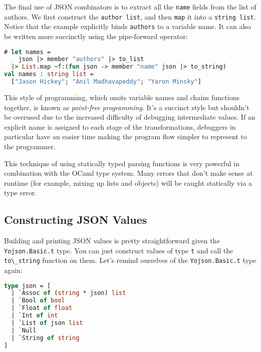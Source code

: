 The final use of JSON combinators is to extract all the
\passthrough{\lstinline!name!} fields from the list of authors. We first
construct the \passthrough{\lstinline!author list!}, and then
\passthrough{\lstinline!map!} it into a
\passthrough{\lstinline!string list!}. Notice that the example
explicitly binds \passthrough{\lstinline!authors!} to a variable name.
It can also be written more succinctly using the pipe-forward operator:

\begin{lstlisting}[language=Caml]
# let names =
    json |> member "authors" |> to_list
  |> List.map ~f:(fun json -> member "name" json |> to_string)
val names : string list =
  ["Jason Hickey"; "Anil Madhavapeddy"; "Yaron Minsky"]
\end{lstlisting}

This style of programming, which omits variable names and chains
functions together, is known as \emph{point-free programming}. It's a
succinct style but shouldn't be overused due to the increased difficulty
of debugging intermediate values. If an explicit {name} is assigned to
each stage of the transformations, debuggers in particular have an
easier time making the program flow simpler to represent to the
programmer.

This technique of using statically typed parsing functions is very
powerful in combination with the OCaml type system. Many errors that
don't make sense at runtime (for example, mixing up lists and objects)
will be caught statically via a type error. ~~

\hypertarget{constructing-json-values}{%
\subsection{Constructing JSON Values}\label{constructing-json-values}}

Building and printing JSON values is pretty straightforward given the
\passthrough{\lstinline!Yojson.Basic.t!} type. You can just construct
values of type \passthrough{\lstinline!t!} and call the
\passthrough{\lstinline!to\_string!} function on them. Let's remind
ourselves of the \passthrough{\lstinline!Yojson.Basic.t!} type again:

\begin{lstlisting}[language=Caml]
type json = [
  | `Assoc of (string * json) list
  | `Bool of bool
  | `Float of float
  | `Int of int
  | `List of json list
  | `Null
  | `String of string
]
\end{lstlisting}

